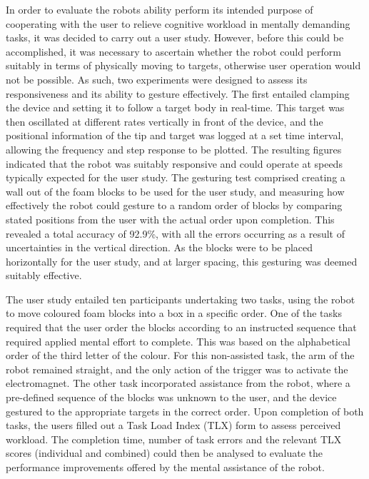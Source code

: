 \documentclass[11pt]{article}
\begin{document}
In order to evaluate the robots ability perform its intended purpose of cooperating with the user to relieve cognitive workload in mentally demanding tasks, it was decided to carry out a user study. However, before this could be accomplished, it was necessary to ascertain whether the robot could perform suitably in terms of physically moving to targets, otherwise user operation would not be possible. As such, two experiments were designed to assess its responsiveness and its ability to gesture effectively. The first entailed clamping the device and setting it to follow a target body in real-time. This target was then oscillated at different rates vertically in front of the device, and the positional information of the tip and target was logged at a set time interval, allowing the frequency and step response to be plotted. The resulting figures indicated that the robot was suitably responsive and could operate at speeds typically expected for the user study. The gesturing test comprised creating a wall out of the foam blocks to be used for the user study, and measuring how effectively the robot could gesture to a random order of blocks by comparing stated positions from the user with the actual order upon completion. This revealed a total accuracy of 92.9\%, with all the errors occurring as a result of uncertainties in the vertical direction. As the blocks were to be placed horizontally for the user study, and at larger spacing, this gesturing was deemed suitably effective.

The user study entailed ten participants undertaking two tasks, using the robot to move coloured foam blocks into a box in a specific order. One of the tasks required that the user order the blocks according to an instructed sequence that required applied mental effort to complete. This was based on the alphabetical order of the third letter of the colour. For this non-assisted task, the arm of the robot remained straight, and the only action of the trigger was to activate the electromagnet. The other task incorporated assistance from the robot, where a pre-defined sequence of the blocks was unknown to the user, and the device gestured to the appropriate targets in the correct order. Upon completion of both tasks, the users filled out a Task Load Index (TLX) form to assess perceived workload. The completion time, number of task errors and the relevant TLX scores (individual and combined) could then be analysed to evaluate the performance improvements offered by the mental assistance of the robot.
\end{document}
